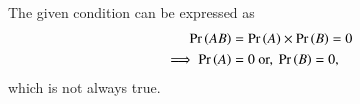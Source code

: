 The given condition can be expressed as
\begin{align}
	\Pr\left(AB\right)&=\Pr\left(A\right) \times \Pr\left(B\right) =
 0
	\\
	\implies \Pr\left(A\right) &= 0 \text{ or, } \Pr\left(B\right) = 0,
 \end{align}
 which is not always true.
